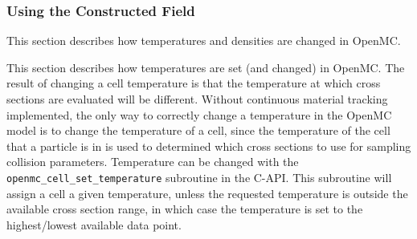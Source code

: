 \documentclass[10pt]{article}
\newcounter{subsubsubsection}[subsubsection]
\numberwithin{equation}{section} %
\begin{document}
\subsubsection{Using the Constructed Field}
This section describes how temperatures and densities are changed in OpenMC.

This section describes how temperatures are set (and changed) in OpenMC. The result of changing a cell temperature is that the temperature at which cross sections are evaluated will be different. Without continuous material tracking implemented, the only way to correctly change a temperature in the OpenMC model is to change the temperature of a cell, since the temperature of the cell that a particle is in is used to determined which cross sections to use for sampling collision parameters. Temperature can be changed with the {\tt openmc\_cell\_set\_temperature} subroutine in the C-API. This subroutine will assign a cell a given temperature, unless the requested temperature is outside the available cross section range, in which case the temperature is set to the highest/lowest available data point.
\end{document}

